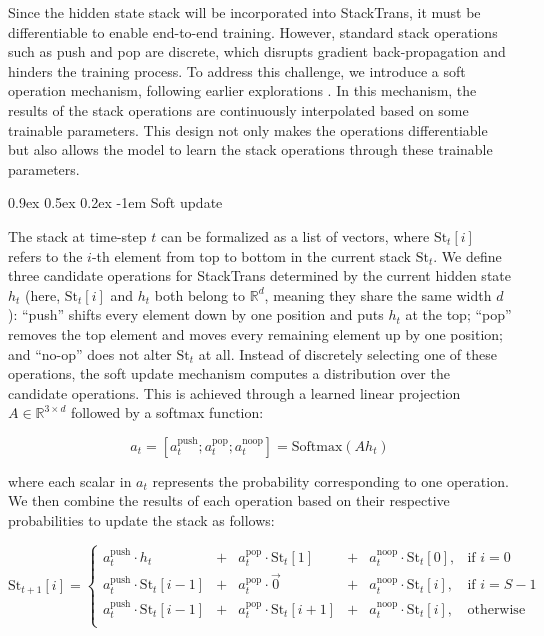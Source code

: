 \documentclass{article}
\makeatletter
\providecommand{\paragraph}{}
\renewcommand{\paragraph}[1]{%
  \@startsection{paragraph}{4}{\z@}%
                {0.9ex \@plus 0.5ex \@minus 0.2ex}%
                {-1em}%
                {\normalsize\bfseries}%
  {#1}
}
\DeclareRobustCommand{\method}{{\sc StackTrans}\xspace}
\makeatother
\begin{document}
Since the hidden state stack will be incorporated into \method, it must be differentiable to enable end-to-end training. 
However, standard stack operations such as push and pop are discrete, which disrupts gradient back-propagation and hinders the training process.
To address this challenge, we introduce a soft operation mechanism, following earlier explorations \citep{grefenstette2015learning, joulin2015inferring}.
In this mechanism, the results of the stack operations are continuously interpolated based on some trainable parameters.
This design not only makes the operations differentiable but also allows the model to learn the stack operations through these trainable parameters.


\paragraph{Soft update}
The stack at time-step $t$ can be formalized as a list of vectors, where $\text{St}_t[i]$ refers to the $i$-th element from top to bottom in the current stack $\text{St}_t$.
We define three candidate operations for \method determined by the current hidden state $h_t$ (here, $\text{St}_t[i]$ and $h_t$ both belong to $\mathbb{R}^d$, meaning they share the same width $d$):
 ``push'' shifts every element down by one position and puts $h_t$ at the top;
 ``pop'' removes the top element and moves every remaining element up by one position;
and  ``no-op'' does not alter $\text{St}_t$ at all.
Instead of discretely selecting one of these operations, the soft update mechanism computes a distribution over the candidate operations. This is achieved through a learned linear projection $A\in\mathbb{R}^{3\times d}$ followed by a softmax function:


\vspace{-10pt}
\begin{equation}
    a_t = [a_t^{\text{push}};a_t^{\text{pop}};a_t^{\text{noop}}] = \text{Softmax}(A h_t)
    \label{eq:action_scores}
\end{equation}


\noindent where each scalar in $a_t$ represents the probability corresponding to one operation. We then combine the results of each operation based on their respective probabilities to update the stack as follows:


\vspace{-10pt}
\begin{equation}
\text{St}_{t+1}[i] = \left\{
\begin{array}{lclcll} 
a_t^{\text{push}} \cdot h_t &+& a_t^{\text{pop}} \cdot \text{St}_{t}[1] &+& a_t^{\text{noop}} \cdot \text{St}_{t}[0], & \text{if } i = 0 \\[3pt]
a_t^{\text{push}} \cdot \text{St}_{t}[i-1] &+& a_t^{\text{pop}} \cdot \vec{0} &+& a_t^{\text{noop}} \cdot \text{St}_{t}[i], & \text{if } i = S-1  \\[3pt]
a_t^{\text{push}} \cdot \text{St}_{t}[i-1] &+& a_t^{\text{pop}} \cdot \text{St}_{t}[i+1] &+& a_t^{\text{noop}} \cdot \text{St}_{t}[i], & \text{otherwise} \\[3pt]
\end{array}\right.
\label{eq:stack_update}
\end{equation}
\end{document}
